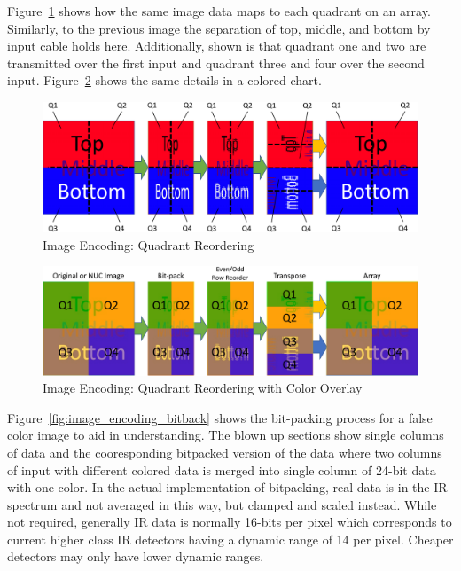     Figure~\ref{fig:image_encoding_quads} shows how the same image data maps to each quadrant on an array. Similarly, to the previous image the separation of top, middle, and bottom by input cable holds here. Additionally, shown is that quadrant one and two are transmitted over the first input and quadrant three and four over the second input. Figure~\ref{fig:image_encoding_colored} shows the same details in a colored chart.

    \begin{figure}
        \centering
        \includegraphics[trim=0in 0in 0in 0in,width=1.0\textwidth]{fig/image_encoding_quads.pdf}
        \caption{Image Encoding: Quadrant Reordering}
        \label{fig:image_encoding_quads}
    \end{figure}

    \begin{figure}
        \centering
        \includegraphics[trim=0in 0in 0in 0in,width=1.0\textwidth]{fig/image_encoding_colored.pdf}
        \caption{Image Encoding: Quadrant Reordering with Color Overlay}
        \label{fig:image_encoding_colored}
    \end{figure}

    Figure~\ref{fig:image_encoding_bitback} shows the bit-packing process for a false color image to aid in understanding. The blown up sections show single columns of data and the cooresponding bitpacked version of the data where two columns of input with different colored data is merged into single column of 24-bit data with one color. In the actual implementation of bitpacking, real data is in the IR-spectrum and not averaged in this way, but clamped and scaled instead. While not required, generally IR data is normally 16-bits per pixel which corresponds to current higher class IR detectors having a dynamic range of 14 per pixel\cite{FLIR1, FLIR2, FLIR3}. Cheaper detectors may only have lower dynamic ranges.

